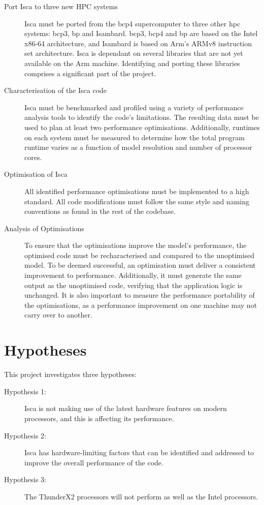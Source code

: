 \documentclass[a4paper,11pt]{report}
\begin{document}
\begin{description}
	\item[Port Isca to three new HPC systems] Isca must be ported from the \gls{bcp4} supercomputer to three other \gls{hpc} systems: \gls{bcp3}, \gls{bp} and Isambard. \gls{bcp3}, \gls{bcp4} and \gls{bp} are based on the Intel x86-64 architecture, and Isambard is based on Arm's ARMv8 instruction set architecture. Isca is dependant on several libraries that are not yet available on the Arm machine. Identifying and porting these libraries comprises a significant part of the project.
	\item[Characterisation of the Isca code] Isca must be benchmarked and profiled using a variety of performance analysis tools to identify the code’s limitations. The resulting data must be used to plan at least two performance optimisations. Additionally, runtimes on each system must be measured to determine how the total program runtime varies as a function of model resolution and number of processor cores. 
	
	\item[Optimisation of Isca] All identified performance optimisations must be implemented to a high standard. All code modifications must follow the same style and naming conventions as found in the rest of the codebase.
	
	\item[Analysis of Optimisations] To ensure that the optimisations improve the model’s performance, the optimised code must be recharacterised and compared to the unoptimised model. To be deemed successful, an optimisation must deliver a consistent improvement to performance. Additionally, it must generate the same output as the unoptimised code, verifying that the application logic is unchanged. It is also important to measure the performance portability of the optimisations, as a performance improvement on one machine may not carry over to another.
	
\end{description}

\section{Hypotheses}
This project investigates three hypotheses:

\begin{description}
\item[Hypothesis 1: ] Isca is not making use of the latest hardware features on modern processors, and this is affecting its performance. 

\item[Hypothesis 2: ] Isca has hardware-limiting factors that can be identified and addressed to improve the overall performance of the code.

\item[Hypothesis 3: ] The ThunderX2 processors will not perform as well as the Intel processors.
\end{description}
\end{document}

